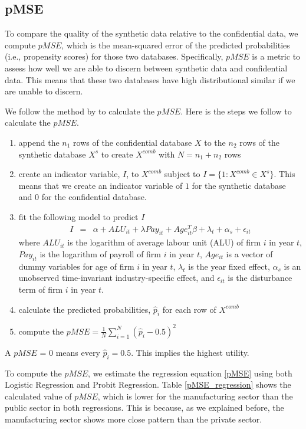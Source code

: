 \documentclass{article}
\begin{document}
\subsection{pMSE}
To compare the quality of the synthetic data relative to the confidential data, we compute $pMSE$, which is the mean-squared error of the predicted probabilities (i.e., propensity scores) for those two databases. Specifically, $pMSE$ is a metric to assess how well we are able to discern between synthetic data and confidential data. This means that these two databases have high distributional similar if we are unable to discern. 

We follow the method by \textcite{SnokeSlavkovic2018} to calculate the $pMSE$. Here is the steps we follow to calculate the $pMSE$. 

\begin{enumerate}
    \item append the $n_1$ rows of the confidential database $X$ to the $n_2$ rows of the synthetic database $X^s$ to create $X^{comb}$ with $N=n_1 + n_2$ rows
    \item create an indicator variable, $I$, to $X^{comb}$ subject to $I=\{1: X^{comb} \in X^s\}$. This means that we create an indicator variable of $1$ for the synthetic database and $0$ for the confidential database. 
    \item fit the following model to predict $I$
    \begin{eqnarray}	
I &=&\alpha +ALU_{it}+\lambda Pay_{it}+Age_{it}^{T}\beta+\lambda_t+\alpha_s+\epsilon_{it} \label{pMSE}
\end{eqnarray}
where $ALU_{it}$ is the logarithm of average labour unit (ALU) of firm $i$ in year $t$, $Pay_{it}$ is the logarithm of payroll of firm $i$ in year $t$, $Age_{it}$ is a vector of dummy variables for age of firm $i$ in year $t$, $\lambda_t$ is the year fixed effect, $\alpha_s$ is an unobserved time-invariant industry-specific effect, and $\epsilon_{it}$ is the disturbance term of firm $i$ in year $t$. 
    \item calculate the predicted probabilities, $\hat{p}_i$ for each row of $X^{comb}$
    \item compute the $pMSE=\frac{1}{N}\sum_{i=1}^N(\hat{p}_i - 0.5)^2$
\end{enumerate}
A $pMSE$ = 0 means every $\hat{p}_i = 0.5$. This implies the highest utility. 

To compute the $pMSE$, we estimate the regression equation \ref{pMSE} using both Logistic Regression and Probit Regression. Table \ref{pMSE_regression} shows the calculated value of $pMSE$, which is lower for the manufacturing sector than the public sector in both regressions. This is because, as we explained before, the manufacturing sector shows more close pattern than the private sector.
\end{document}
